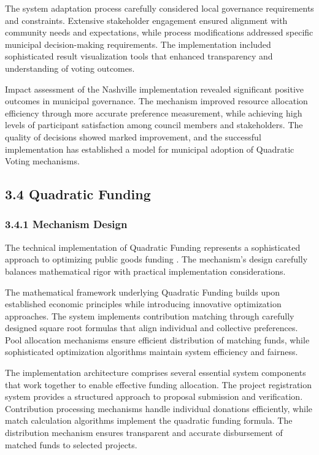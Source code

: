 The system adaptation process carefully considered local governance requirements and constraints. Extensive stakeholder engagement ensured alignment with community needs and expectations, while process modifications addressed specific municipal decision-making requirements. The implementation included sophisticated result visualization tools that enhanced transparency and understanding of voting outcomes.

Impact assessment of the Nashville implementation revealed significant positive outcomes in municipal governance. The mechanism improved resource allocation efficiency through more accurate preference measurement, while achieving high levels of participant satisfaction among council members and stakeholders. The quality of decisions showed marked improvement, and the successful implementation has established a model for municipal adoption of Quadratic Voting mechanisms.

\hypertarget{quadratic-funding}{%
\subsection{3.4 Quadratic Funding}\label{quadratic-funding}}

\hypertarget{mechanism-design}{%
\subsubsection{3.4.1 Mechanism Design}\label{mechanism-design}}

The technical implementation of Quadratic Funding represents a sophisticated approach to optimizing public goods funding \citep{buterin2019flexible}. The mechanism's design carefully balances mathematical rigor with practical implementation considerations.

The mathematical framework underlying Quadratic Funding builds upon established economic principles while introducing innovative optimization approaches. The system implements contribution matching through carefully designed square root formulas that align individual and collective preferences. Pool allocation mechanisms ensure efficient distribution of matching funds, while sophisticated optimization algorithms maintain system efficiency and fairness.

The implementation architecture comprises several essential system components that work together to enable effective funding allocation. The project registration system provides a structured approach to proposal submission and verification. Contribution processing mechanisms handle individual donations efficiently, while match calculation algorithms implement the quadratic funding formula. The distribution mechanism ensures transparent and accurate disbursement of matched funds to selected projects.

